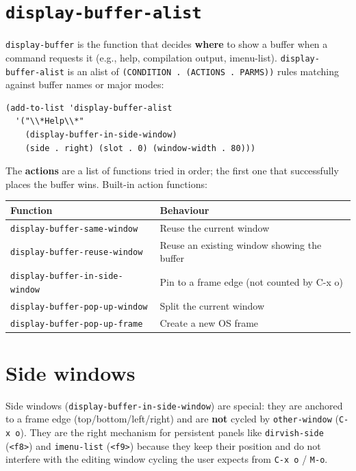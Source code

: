 \section{\texttt{display-buffer-alist}}\label{display-buffer-alist}

\texttt{display-buffer} is the function that decides \textbf{where} to show a buffer when a command requests it (e.g., help, compilation output, imenu-list). \texttt{display-buffer-alist} is an alist of \texttt{(CONDITION . (ACTIONS . PARMS))} rules matching against buffer names or major modes:

\begin{verbatim}
(add-to-list 'display-buffer-alist
  '("\\*Help\\*"
    (display-buffer-in-side-window)
    (side . right) (slot . 0) (window-width . 80)))
\end{verbatim}

The \textbf{actions} are a list of functions tried in order; the first one that successfully places the buffer wins. Built-in action functions:

\begin{longtable}[]{@{}ll@{}}
\toprule
Function & Behaviour \\
\midrule
\texttt{display-buffer-same-window} & Reuse the current window \\
\texttt{display-buffer-reuse-window} & Reuse an existing window showing the buffer \\
\texttt{display-buffer-in-side-window} & Pin to a frame edge (not counted by C-x o) \\
\texttt{display-buffer-pop-up-window} & Split the current window \\
\texttt{display-buffer-pop-up-frame} & Create a new OS frame \\
\bottomrule
\end{longtable}

\section{Side windows}\label{side-windows}

Side windows (\texttt{display-buffer-in-side-window}) are special: they are anchored to a frame edge (top/bottom/left/right) and are \textbf{not} cycled by \texttt{other-window} (\texttt{C-x o}). They are the right mechanism for persistent panels like \texttt{dirvish-side} (\texttt{<f8>}) and \texttt{imenu-list} (\texttt{<f9>}) because they keep their position and do not interfere with the editing window cycling the user expects from \texttt{C-x o} / \texttt{M-o}.

